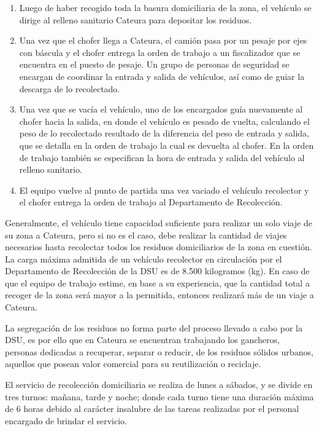 \begin{enumerate}
\item Luego de haber recogido toda la basura domiciliaria de la zona, el vehículo se dirige al relleno sanitario Cateura para depositar los residuos. 
\item Una vez que el chofer llega a Cateura, el camión pasa por un pesaje por ejes con báscula y el chofer entrega la orden de trabajo a un fiscalizador que se encuentra en el puesto de pesaje. Un grupo de personas de seguridad se encargan de coordinar la entrada y salida de vehículos, así como de guiar la descarga de lo recolectado. 
\item Una vez que se vacía el vehículo, uno de los encargados guía nuevamente al chofer hacia la salida, en donde el vehículo es pesado de vuelta, calculando el peso de lo recolectado resultado de la diferencia del peso de entrada y salida, que se detalla en la orden de trabajo la cual es devuelta al chofer. En la orden de trabajo también se especifican la hora de entrada y salida del vehículo al relleno sanitario.
\item El equipo vuelve al punto de partida una vez vaciado el vehículo recolector y el chofer entrega la orden de trabajo al Departamento de Recolección.  
\end{enumerate}

Generalmente, el vehículo tiene capacidad suficiente para realizar un solo viaje de su zona a Cateura, pero si no es el caso, debe realizar la cantidad de viajes necesarios hasta recolectar todos los residuos domiciliarios de la zona en cuestión. La carga máxima admitida de un vehículo recolector en circulación por el Departamento de Recolección de la DSU es de 8.500 kilogramos (kg). En caso de que el equipo de trabajo estime, en base a su experiencia, que la cantidad total a recoger de la zona será mayor a la permitida, entonces realizará más de un viaje a Cateura.

La segregación de los residuos no forma parte del proceso llevado a cabo por la DSU, es por ello que en Cateura se encuentran trabajando los gancheros, personas dedicadas a recuperar, separar o reducir, de los residuos sólidos urbanos, aquellos que posean valor comercial para su reutilización o reciclaje.

El servicio de recolección domiciliaria se realiza de lunes a sábados, y se divide en tres turnos: mañana, tarde y noche; donde cada turno tiene una duración máxima de 6 horas debido al carácter insalubre de las tareas realizadas por el personal encargado de brindar el servicio.


